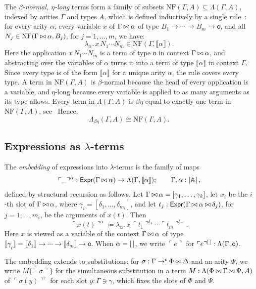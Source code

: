 The \emph{$\beta$-normal, $\eta$-long} terms form a family of subsets $\mathrm{NF}(\Gamma, A) \subseteq \Lambda(\Gamma, A)$, indexed by arities $\Gamma$ and types $A$, which is defined inductively by a single rule~\cite[\S3.1]{KellerAltenkirch2010}: for every arity $\alpha$, every variable $x$ of $\Gamma \mathbin{\bowtie} \alpha$ of type $B_1 \to \cdots \to B_m \to \mathsf{o}$, and all $N_j \in \mathrm{NF}(\Gamma \mathbin{\bowtie} \alpha, B_j)$, for $j = 1, \ldots, m$, we have:
\[
\lambda_\alpha.\, x\, N_1 \cdots N_m \in \mathrm{NF}(\Gamma, \llbracket \alpha \rrbracket).
\]
Here the application $x\, N_1 \cdots N_m$ is a term of type $\mathsf{o}$ in context $\Gamma \mathbin{\bowtie} \alpha$, and abstracting over the variables of $\alpha$ turns it into a term of type $\llbracket \alpha \rrbracket$ in context $\Gamma$. Since every type is of the form $\llbracket \alpha \rrbracket$ for a unique arity $\alpha$, the rule covers every type. A term in $\mathrm{NF}(\Gamma, A)$ is $\beta$-normal because the head of every application is a variable, and $\eta$-long because every variable is applied to as many arguments as its type allows. Every term in $\Lambda(\Gamma, A)$ is $\beta\eta$-equal to exactly one term in $\mathrm{NF}(\Gamma, A)$, see~\cite{JayGhani1995} Hence,
\[
\Lambda_{\beta\eta}(\Gamma,A) \cong \mathrm{NF}(\Gamma, A).
\]

\subsection{Expressions as \texorpdfstring{$\lambda$}{lambda}-terms}

\begin{definition}\label{def:translation}
    The \emph{embedding} of expressions into $\lambda$-terms is the family of maps
    \[
    \ulcorner \_ \urcorner^\alpha : \mathsf{Expr}(\Gamma \mathbin{\bowtie} \alpha) \to \Lambda(\Gamma, \llbracket \alpha \rrbracket); \qquad \Gamma, \alpha : \left|\mathbb{A}\right|,
    \]
    defined by structural recursion as follows. Let $\Gamma \mathbin{\bowtie} \alpha = [\gamma_1, \ldots, \gamma_k]$, let $x_i$ be the $i$-th slot of $\Gamma \mathbin{\bowtie} \alpha$, where $\gamma_i = [\delta_1, \ldots, \delta_{m_i}]$, and let $t_j : \mathsf{Expr}(\Gamma \mathbin{\bowtie} \alpha \mathbin{\bowtie} \delta_j)$, for $j = 1, \ldots, m_i$, be the arguments of $x(t)$. Then
    \[
    \ulcorner x(t) \urcorner^\alpha \coloneqq \lambda_\alpha.\, x\, \ulcorner t_1 \urcorner^{\delta_1} \cdots \ulcorner t_m \urcorner^{\delta_m}.
    \]
    Here $x$ is viewed as a variable of the context $\Gamma \mathbin{\bowtie} \alpha$ of type $\llbracket \gamma_i \rrbracket = \llbracket \delta_1 \rrbracket \to \cdots \to \llbracket \delta_m \rrbracket \to \mathsf{o}$. When $\alpha = \left[\,\right]$, we write $\ulcorner e \urcorner$ for $\ulcorner e \urcorner^{\left[\,\right]} : \Lambda(\Gamma, \mathsf{o})$.

    The embedding extends to substitutions: for $\sigma : \Gamma \to^{\mathsf{s}} \Phi \mathbin{\bowtie} \Delta$ and an arity $\Psi$, we write $M\{\ulcorner \sigma \urcorner\}$ for the simultaneous substitution in a term $M : \Lambda(\Phi \mathbin{\bowtie} \Gamma \mathbin{\bowtie} \Psi, A)$ of $\ulcorner \sigma(y) \urcorner^\gamma$ for each slot $y : \Gamma \ni \gamma$, which fixes the slots of $\Phi$ and $\Psi$.
\end{definition}


